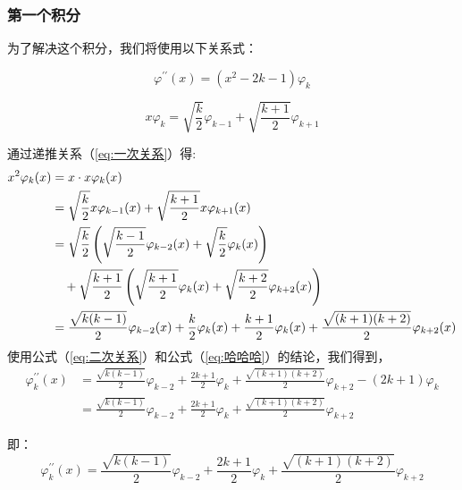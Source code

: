 \documentclass[12pt]{ctexart}
\numberwithin{equation}{section} %
\begin{document}
\subsubsection{第一个积分}为了解决这个积分，我们将使用以下关系式：

\begin{equation}
    \varphi^{\prime\prime}(x) = (x^2-2k-1)\varphi_k 
    \label{eq:哈哈哈}
\end{equation}
    
\begin{equation}
    x\varphi_k = \sqrt{\frac{k}{2}}\varphi_{k-1} + \sqrt{\frac{k+1}{2}}\varphi_{k+1}
    \label{eq:一次关系}
\end{equation}

通过递推关系（\ref{eq:一次关系}）得:
\begin{align}
    x^{2}\varphi_{k}(x) &= x \cdot x\varphi_{k}(x) \notag \\
    &= \sqrt{\frac{k}{2}} x\varphi_{k-1}(x) + \sqrt{\frac{k+1}{2}}x\varphi_{k+1}(x) \notag \\
    &= \sqrt{\frac{k}{2}}\left(\sqrt{\frac{k-1}{2}}\varphi_{k-2}(x) + \sqrt{\frac{k}{2}}\varphi_{k}(x)\right)\notag  \\
    &\quad + \sqrt{\frac{k+1}{2}}\left(\sqrt{\frac{k+1}{2}}\varphi_{k}(x) + \sqrt{\frac{k+2}{2}}\varphi_{k+2}(x)\right)\notag \\
    &= \frac{\sqrt{k(k-1)}}{2}\varphi_{k-2}(x) + \frac{k}{2}\varphi_{k}(x) + \frac{k+1}{2}\varphi_{k}(x) + \frac{\sqrt{(k+1)(k+2)}}{2}\varphi_{k+2}(x) 
    \label{eq:二次关系}
 \end{align}
使用公式（\ref{eq:二次关系}）和公式（\ref{eq:哈哈哈}）的结论，我们得到，
\begin{align}
        \varphi_{k}^{\prime\prime}(x) &= \frac{\sqrt{k(k-1)}}{2}\varphi_{k-2} + \frac{2k+1}{2}\varphi_{k} + \frac{\sqrt{(k+1)(k+2)}}{2}\varphi_{k+2} - (2k+1)\varphi_{k} \\
        &= \frac{\sqrt{k(k-1)}}{2}\varphi_{k-2} + \frac{2k+1}{2}\varphi_{k} + \frac{\sqrt{(k+1)(k+2)}}{2}\varphi_{k+2}
\end{align}

即：
\begin{equation}
    \boxed{ \varphi_{k}^{\prime\prime}(x)=\frac{\sqrt{k(k-1)}}{2}\varphi_{k-2} + \frac{2k+1}{2}\varphi_{k} + \frac{\sqrt{(k+1)(k+2)}}{2}\varphi_{k+2}}
\label{eq:二阶导递推}
\end{equation}
\end{document}
